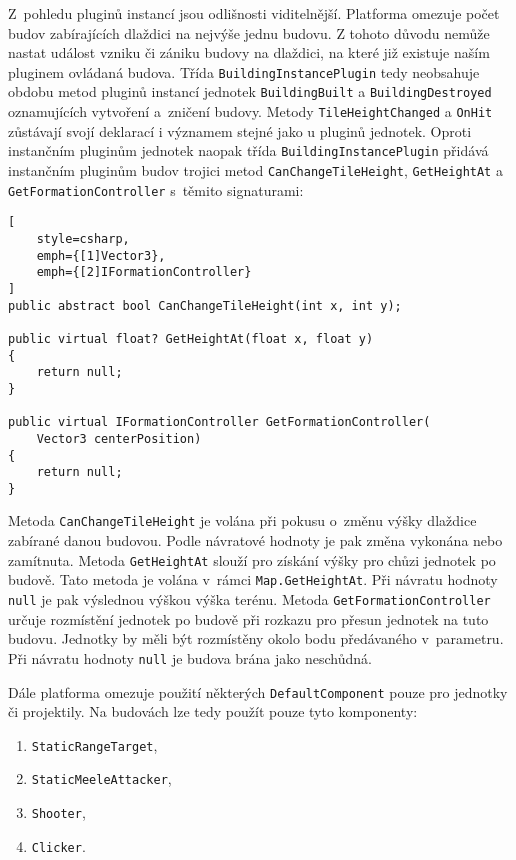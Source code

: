 Z~pohledu pluginů instancí jsou odlišnosti viditelnější. Platforma omezuje počet budov zabírajících dlaždici na nejvýše jednu budovu. Z tohoto důvodu nemůže nastat událost vzniku či zániku budovy na dlaždici, na které již existuje naším pluginem ovládaná budova. Třída \texttt{BuildingInstancePlugin} tedy neobsahuje obdobu metod pluginů instancí jednotek \texttt{BuildingBuilt} a \texttt{BuildingDestroyed} oznamujících vytvoření a~zničení budovy. Metody \texttt{TileHeightChanged} a \texttt{OnHit} zůstávají svojí deklarací i významem stejné jako u pluginů jednotek. Oproti instančním pluginům jednotek naopak třída \texttt{BuildingInstancePlugin} přidává instančním pluginům budov trojici metod \texttt{CanChangeTileHeight}, \texttt{GetHeightAt} a \texttt{GetFormationController} s~těmito signaturami:

\begin{lstlisting}[
	style=csharp,
	emph={[1]Vector3},
	emph={[2]IFormationController}
]
public abstract bool CanChangeTileHeight(int x, int y);

public virtual float? GetHeightAt(float x, float y)
{
	return null;
}

public virtual IFormationController GetFormationController(
	Vector3 centerPosition)
{
	return null;
}
\end{lstlisting}

Metoda \texttt{CanChangeTileHeight} je volána při pokusu o~změnu výšky dlaždice zabírané danou budovou. Podle návratové hodnoty je pak změna vykonána nebo zamítnuta. Metoda \texttt{GetHeightAt} slouží pro získání výšky pro chůzi jednotek po budově. Tato metoda je volána v~rámci \texttt{Map.GetHeightAt}. Při návratu hodnoty \texttt{null} je pak výslednou výškou výška terénu. Metoda \texttt{GetFormationController} určuje rozmístění jednotek po budově při rozkazu pro přesun jednotek na tuto budovu. Jednotky by měli být rozmístěny okolo bodu předávaného v~parametru. Při návratu hodnoty \texttt{null} je budova brána jako neschůdná.


Dále platforma omezuje použití některých \texttt{DefaultComponent} pouze pro jednotky či projektily. Na budovách lze tedy použít pouze tyto komponenty:
\begin{enumerate}
	\item \texttt{StaticRangeTarget},
	\item \texttt{StaticMeeleAttacker},
	\item \texttt{Shooter},
	\item \texttt{Clicker}.
\end{enumerate}

